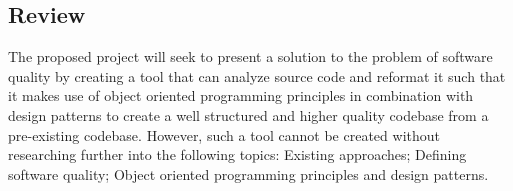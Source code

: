 \subsection{Review}
The proposed project will seek to present a solution to the problem of software quality by creating a tool that can analyze source code and reformat it such that it makes use of object oriented programming principles in combination with design patterns to create a well structured and higher quality codebase from a pre-existing codebase.
However, such a tool cannot be created without researching further into the following topics: Existing approaches; Defining software quality; Object oriented programming principles and design patterns.
